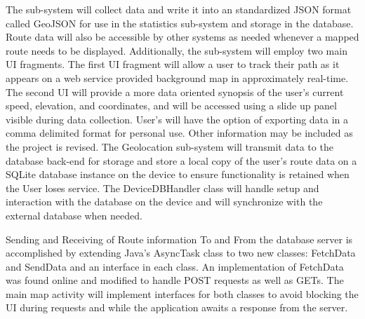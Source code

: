 \documentclass{article}
\begin{document}
The sub-system will collect data and write it into an standardized JSON format called GeoJSON for use in the statistics sub-system and storage in the database. Route data will also be accessible by other systems as needed whenever a mapped route needs to be displayed. Additionally, the sub-system will employ two main UI fragments. The first UI fragment will allow a user to track their path as it appears on a web service provided background map in approximately real-time. The second UI will provide a more data oriented synopsis of the user’s current speed, elevation, and coordinates, and will be accessed using a slide up panel visible during data collection. User’s will have the option of exporting data in a comma delimited format for personal use. Other information may be included as the project is revised. The Geolocation sub-system will transmit data to the database back-end for storage and store a local copy of the user's route data on a SQLite database instance on the device to ensure functionality is retained when the User loses service. The DeviceDBHandler class will handle setup and interaction with the database on the device and will synchronize with the external database when needed.

Sending and Receiving of Route information To and From the database server is accomplished by extending Java's AsyncTask\cite{g_AsyncTask} class to two new classes: FetchData and SendData and an interface in each class. An implementation of FetchData was found online and modified to handle POST requests as well as GETs.\cite{g_asyncget} The main map activity will implement interfaces for both classes to avoid blocking the UI during requests and while the application awaits a response from the server.
\end{document}
